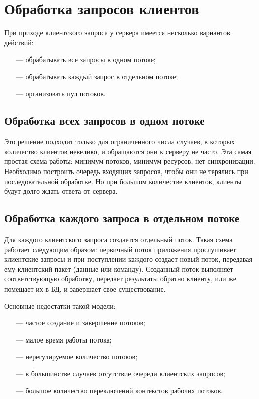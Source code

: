 \section{Обработка запросов клиентов}

При приходе клиентского запроса у сервера имеется несколько вариан­тов действий:

\begin{itemize}
	\item[---] обрабатывать все запросы в одном потоке;
	\item[---] обрабатывать каждый запрос в отдельном потоке;
	\item[---] организовать пул потоков.
\end{itemize}

\subsection{Обработка всех запросов в одном потоке}

Это решение подходит только для ограниченного числа случаев, в которых количество клиентов невелико, и обращаются они к серверу не часто. Эта самая простая схема работы: минимум потоков, минимум ресурсов, нет синхронизации. Необходимо построить очередь входящих запросов, чтобы они не терялись при последовательной обработке. Но при большом количестве клиентов, клиенты будут долго ждать ответа от сервера.

\subsection{Обработка каждого запроса в отдельном потоке}

Для каждого клиентского запроса создается отдельный поток. Такая схема работает следующим образом: первичный поток приложения прослуши­вает клиентские запросы и при поступлении каждого создает новый поток, передавая ему клиентский пакет (данные или команду). Созданный поток выполняет соответствующую обработку, передает результаты обратно клиенту, или же помещает их в БД, и завершает свое существование.

Основные недостатки такой модели:

\begin{itemize}
	\item[---] частое создание и завершение потоков;
	\item[---] малое время работы потока;
	\item[---] нерегулируемое количество потоков;
	\item[---] в большинстве случаев отсутствие очереди клиентских запросов;
	\item[---] большое количество переключений контекстов рабочих потоков.			
\end{itemize}

